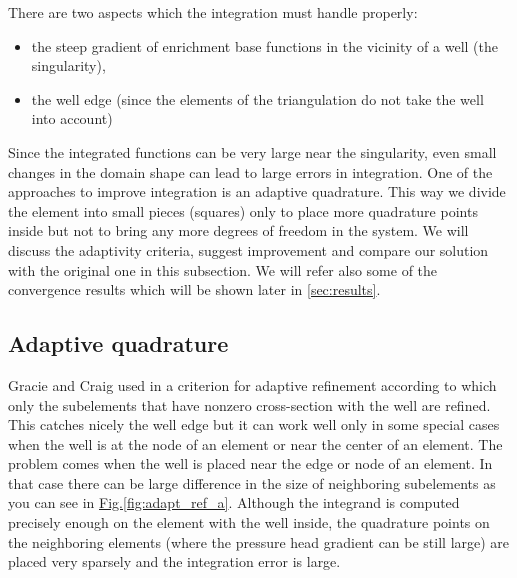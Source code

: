 \documentclass[preprint,12pt]{elsarticle}
\newcommand{\fig}[1]{\hyperref[#1]{Fig.\ref{#1}}}
\newcommand{\notePE}[1]{{\color{Orange} \textbf{PE: } \textit{#1}}}
\begin{document}
There are two aspects which the integration must handle properly:
\begin{itemize}
  \item the steep gradient of enrichment base functions in the vicinity of a well (the singularity),
  \item the well edge (since the elements of the triangulation do not take the well into account)
\end{itemize}

Since the integrated functions can be very large near the singularity, even small changes in the domain shape 
can lead to large errors in integration.
One of the approaches to improve integration is an adaptive quadrature. This way we divide the element into 
small pieces (squares) only to place more quadrature points inside but not to bring any more degrees of freedom 
in the system. We will discuss the adaptivity criteria, suggest improvement and compare our solution
with the original one in this subsection. We will refer also some of the convergence results which will be 
shown later in \ref{sec:results}.

\subsection{Adaptive quadrature}
\label{sec:refinement_element}

Gracie and Craig used in \cite{gracie} a criterion for adaptive refinement according to which only the subelements 
that have nonzero cross-section with the well are refined. This catches nicely the well edge but it can work 
well only in some special cases when the well is at the node of an element or near the center of an element. 
The problem comes when the well is placed near the edge or node of an element. In that case there can be
large difference in the size of neighboring subelements as you can see in \fig{fig:adapt_ref_a}. Although
the integrand is computed precisely enough on the element with the well inside, the quadrature points on the
neighboring elements (where the pressure head gradient can be still large) are placed very sparsely 
and the integration error is large.
\end{document}
